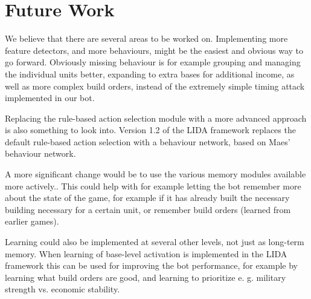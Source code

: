 \section{Future Work}
\label{sec:futurework}
We believe that there are several areas to be worked on. Implementing more feature detectors, and more behaviours, might be the easiest and obvious way to go forward. Obviously missing behaviour is for example grouping and managing the individual units better, expanding to extra bases for additional income, as well as more complex build orders, instead of the extremely simple timing attack implemented in our bot.

Replacing the rule-based action selection module with a more advanced approach is also something to look into. Version 1.2 of the LIDA framework replaces the default rule-based action selection with a behaviour network, based on Maes' behaviour network.\cite{maes1989right}

A more significant change would be to use the various memory modules available more actively.\cite{franklin2007lida}. This could help with for example letting the bot remember more about the state of the game, for example if it has already built the necessary building necessary for a certain unit, or remember build orders (learned from earlier games).

Learning could also be implemented at several other levels, not just as long-term memory. When learning of base-level activation is implemented in the LIDA framework this can be used for improving the bot performance, for example by learning what build orders are good, and learning to prioritize e. g. military strength vs. economic stability.
